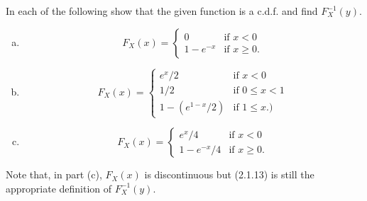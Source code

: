 \documentclass[14pt]{elegantbook}
\begin{document}
    \begin{exercise}
        In each of the following show that the given function is a c.d.f. and find $F_X^{-1}(y)$. \begin{enumerate}[(a)]
            \item \[F_X(x)=\left\{\begin{matrix}
                0&\text{if }x<0\\
                1-e^{-x}&\text{if }x\geq 0. 
            \end{matrix}\right.\]
            \item \[F_X(x)=\left\{\begin{matrix}
                e^x/2&\text{if }x<0\\
                1/2&\text{if }0\leq x<1\\
                1-(e^{1-x}/2)&\text{if }1\leq x.)
            \end{matrix}\right.\]
            \item \[F_X(x)=\left\{\begin{matrix}
                e^x/4&\text{if }x<0\\
                1-e^{-x}/4&\text{if }x\geq 0. 
            \end{matrix}\right.\]
        \end{enumerate}
        Note that, in part (c), $F_X(x)$ is discontinuous but (2.1.13) is still the appropriate definition of $F_X^{-1}(y)$. 
    \end{exercise}
\end{document}

